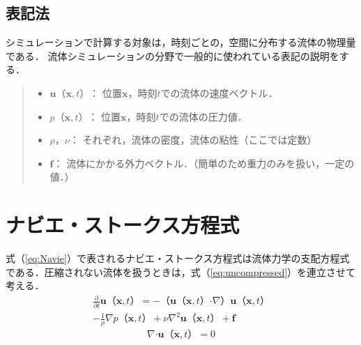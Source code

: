 \documentclass[10pt,a4paper,notitlepage,oneside,twocolumn]{abst_jsarticle}
\begin{document}
\subsection{表記法}
シミュレーションで計算する対象は，時刻ごとの，空間に分布する流体の物理量である．
流体シミュレーションの分野で一般的に使われている表記の説明をする．
\begin{quote}
	\begin{itemize}
		\item $\bm{u}（\bm{x},t）：$ 位置$\bm{x}$，時刻$t$での流体の速度ベクトル．
		\item $p（\bm{x},t）：$ 位置$\bm{x}$，時刻$t$での流体の圧力値．
		\item $\rho，\nu：$ それぞれ，流体の密度，流体の粘性（ここでは定数）
		\item $\bm{f}：$ 流体にかかる外力ベクトル．（簡単のため重力のみを扱い，一定の値．）
	\end{itemize}
\end{quote}
\section{ナビエ・ストークス方程式} \label{chapter:3}
式（\ref{eq:Navie}）で表されるナビエ・ストークス方程式は流体力学の支配方程式である．圧縮されない流体を扱うときは，式（\ref{eq:uncompressed}）を連立させて考える．
\begin{equation}\label{eq:Navie}
\begin{split}
\frac{\partial}{\partial t}\bm{u}（\bm{x},t） = -（\bm{u}（\bm{x},t） \boldsymbol{\cdot}\nabla）\bm{u}（\bm{x},t）\\  - \frac{1}{\rho}\nabla p（\bm{x},t） + \nu\nabla^2\bm{u}（\bm{x},t） + \bm{f}
\end{split}
\end{equation}
\begin{equation}\label{eq:uncompressed}
\nabla\boldsymbol{\cdot}\bm{u}（\bm{x},t） = 0
\end{equation}
\end{document}
